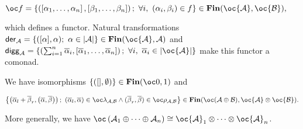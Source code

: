 \(\oc f =\left\{\left(\left[\alpha_1,\ldots,\alpha_n\right],\left[\beta_1,\ldots,\beta_n\right]\right);\  \forall i,\ (\alpha_i,\beta_i)\in f\right\} \in \mathbf{Fin}(\oc {\mathcal A}, \oc {\mathcal B}),\)

which defines a functor. Natural transformations
\(\mathsf{der}_{{\mathcal A}}=\left\{([\alpha],\alpha);\  \alpha\in \web{{\mathcal A}}\right\}\in\mathbf{Fin}(\oc{\mathcal A},{\mathcal A})\)
and
\(\mathsf{digg}_{{\mathcal A}}=\left\{\left(\sum_{i=1}^n\overline\alpha_i,\left[\overline\alpha_1,\ldots,\overline\alpha_n\right]\right);\ \forall i,\ \overline\alpha_i\in\web{\oc {\mathcal A}}\right\}\)
make this functor a comonad.

\begin{example}\label{example.-3}
We have isomorphisms
\(\left\{([],\emptyset)\right\}\in\mathbf{Fin}(\oc\zero,\one)\) and

\(\left\{ \left(\overline\alpha_l+\overline\beta_r,\left(\overline\alpha,\overline\beta\right)\right);\ (\overline\alpha_l,\overline\alpha)\in\oc\lambda_{{\mathcal A},{\mathcal B}}\wedge(\overline\beta_r,\overline\beta)\in\oc\rho_{{\mathcal A},{\mathcal B}}\right\} \in\mathbf{Fin}(\oc({\mathcal A}\oplus{\mathcal B}),\oc{\mathcal A}\tens\oc{\mathcal B}).\)

More generally, we have
\(\oc\left({\mathcal A}_1\oplus\cdots\oplus{\mathcal A}_n\right)\cong\oc{\mathcal A}_1\tens\cdots\tens\oc{\mathcal A}_n\).
\end{example}


